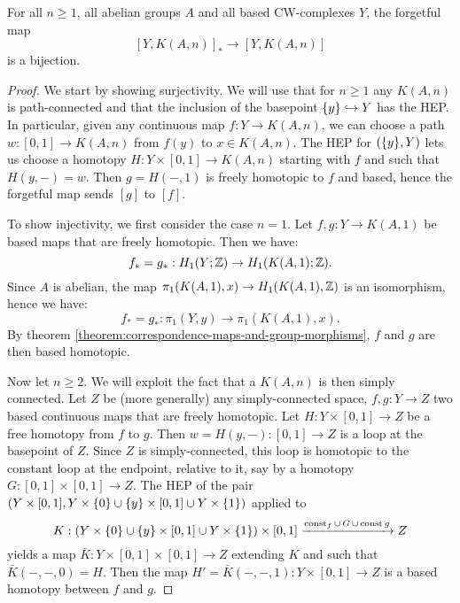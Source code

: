 \begin{lemma}
For all $n\ge1$, all abelian groups $A$ and all based CW-complexes $Y$, the forgetful map
\[[Y,K(A,n)]_*\to [Y,K(A,n)]\]
is a bijection.
\end{lemma}

\begin{proof}
We start by showing surjectivity. We will use that for $n\ge1$ any $K(A,n)$ is path-connected and that the inclusion of the basepoint $\{y\}\hookrightarrow Y$ has the HEP. In particular, given any continuous map $f:Y\to K(A,n)$, we can choose a path $w:[0,1]\to K(A,n)$ from $f(y)$ to $x\in K(A,n)$. The HEP for $(\{y\},Y)$ lets us choose a homotopy $H:Y\times[0,1]\to K(A,n)$ starting with $f$ and such that $H(y,-)=w$. Then $g=H(-,1)$ is freely homotopic to $f$ and based, hence the forgetful map sends $[g]$ to $[f]$.

To show injectivity, we first consider the case $n=1$. Let $f,g:Y\to K(A,1)$ be based maps that are freely homotopic. Then we have:
\[f_*=g_*:H_1(Y;{\mathbb Z})\to H_1(K(A,1);{\mathbb Z}).\]
Since $A$ is abelian, the map $\pi_1(K(A,1),x)\to H_1(K(A,1),{\mathbb Z})$ is an isomorphism, hence we have:
\[f_*=g_*:\pi_1(Y,y)\to \pi_1(K(A,1),x).\]
By theorem \ref{theorem:correspondence-maps-and-group-morphisms}, $f$ and $g$ are then based homotopic.

Now let $n\ge2$. We will exploit the fact that a $K(A,n)$ is then simply connected. Let $Z$ be (more generally) any simply-connected space, $f,g:Y\to Z$ two based continuous maps that are freely homotopic. Let $H:Y\times[0,1]\to Z$ be a free homotopy from $f$ to $g$. Then $w=H(y,-):[0,1]\to Z$ is a loop at the basepoint of $Z$. Since $Z$ is simply-connected, this loop is homotopic to the constant loop at the endpoint, relative to it, say by a homotopy $G:[0,1]\times[0,1]\to Z$. The HEP of the pair $(Y\times[0,1],Y\times\{0\}\cup\{y\}\times[0,1]\cup Y\times\{1\})$ applied to
\[K:(Y\times\{0\}\cup\{y\}\times[0,1]\cup Y\times\{1\})\times[0,1]\xrightarrow{\operatorname{const}_f\cup\,G\,\cup\, \operatorname{const} g} Z\]
yields a map $\bar K:Y\times[0,1]\times[0,1]\to Z$ extending $K$ and such that $\bar K(-,-,0)=H$. Then the map $H'=\bar K(-,-,1):Y\times[0,1]\to Z$ is a based homotopy between $f$ and $g$.
\end{proof}

